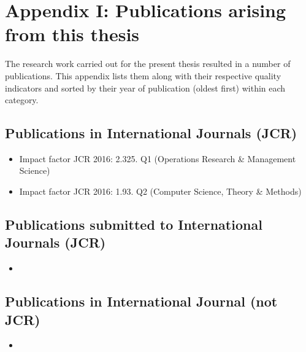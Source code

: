 



\chapter*{Appendix I: Publications arising from this thesis}
\label{AppendixA}

The research work carried out for the present thesis resulted in a number of
publications. This appendix lists them along with their respective quality indicators
and sorted by their year of publication (oldest first) within each category.


\section*{Publications in International Journals (JCR)}

\begin{itemize}

\item [\cite{Gutierrez-Alcoba16}]  

Impact factor JCR 2016: 2.325. Q1 (Operations Research \& Management Science)

\item [\cite{GutierrezAlcoba201712}]  

Impact factor JCR 2016: 1.93. Q2 (Computer Science, Theory \& Methods) 

\end{itemize}

\section*{Publications submitted to International Journals (JCR)}
\begin{itemize}
	\item [\cite{GutierrezAlcoba:EJOR2017}]  
	
	 	
\end{itemize}



\section*{Publications in International Journal (not JCR)}
\begin{itemize}
\item [\cite{GutierrezAlcoba:ICCS2017}]  
\end{itemize}

